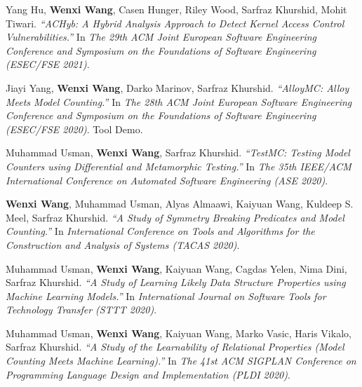 \begin{thebibliography}{99}
	Yang Hu, \textbf{Wenxi Wang}, Casen Hunger, Riley Wood, Sarfraz Khurshid, Mohit Tiwari.
	\emph{``ACHyb: A Hybrid Analysis Approach to Detect Kernel Access Control Vulnerabilities.''}
	In \textit{The 29th ACM Joint European Software Engineering Conference and Symposium on the Foundations of Software Engineering (ESEC/FSE 2021)}. \href{https://wenxiwang.github.io/papers/ACHyb.pdf}{\color{color1}{\textbf{[PDF]}}}
	
	Jiayi Yang, \textbf{Wenxi Wang}, Darko Marinov, Sarfraz Khurshid.
	\emph{``AlloyMC: Alloy Meets Model Counting.''}
	In \textit{The 28th ACM Joint European Software Engineering Conference and Symposium on the Foundations of Software Engineering (ESEC/FSE 2020)}. Tool Demo. \href{https://wenxiwang.github.io/papers/AlloyMC.pdf}{\color{color1}{\textbf{[PDF]}}}
	
	Muhammad Usman, \textbf{Wenxi Wang}, Sarfraz Khurshid.
	\emph{``TestMC: Testing Model Counters using Differential and
		Metamorphic Testing.''}
	In \textit{The 35th IEEE/ACM International Conference on Automated Software Engineering (ASE 2020)}. \href{https://wenxiwang.github.io/papers/TestMC.pdf}{\color{color1}{\textbf{[PDF]}}}
	
	\textbf{Wenxi Wang}, Muhammad Usman, Alyas Almaawi, Kaiyuan Wang, Kuldeep S. Meel, Sarfraz Khurshid.
	\emph{``A Study of Symmetry Breaking Predicates and Model Counting.''}
	In \textit{International Conference on Tools and Algorithms for the Construction and Analysis of Systems (TACAS 2020)}. \href{https://wenxiwang.github.io/papers/symmetry_study.pdf}{\color{color1}{\textbf{[PDF]}}}
	
	Muhammad Usman, \textbf{Wenxi Wang}, Kaiyuan Wang, Cagdas Yelen, Nima Dini, Sarfraz Khurshid.
	\emph{``A Study of Learning Likely Data Structure Properties using Machine Learning Models.''}
	In \textit{International Journal on Software Tools for Technology Transfer (STTT 2020)}. \href{https://wenxiwang.github.io/papers/sttt2020.pdf}{\color{color1}{\textbf{[PDF]}}}
	
	Muhammad Usman, \textbf{Wenxi Wang}, Kaiyuan Wang, Marko Vasic, Haris Vikalo, Sarfraz Khurshid.
	\emph{``A Study of the Learnability of Relational Properties (Model Counting Meets Machine Learning).''}
	In \textit{The 41st ACM SIGPLAN Conference on Programming Language Design and Implementation (PLDI 2020)}. \href{https://wenxiwang.github.io/papers/PLDI2020.pdf}{\color{color1}{\textbf{[PDF]}}}
	

\end{thebibliography}

